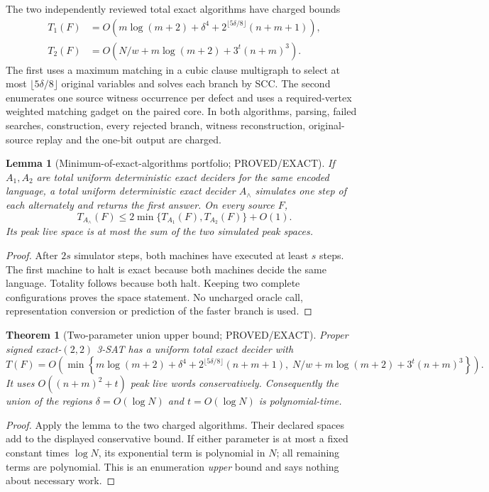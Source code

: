 \documentclass[11pt]{article}
\newtheorem{theorem}{Theorem}
\newtheorem{lemma}{Lemma}
\begin{document}
The two independently reviewed total exact algorithms have charged bounds
\begin{align*}
T_1(F)&=O\!\left(m\log(m+2)+\delta^4+
  2^{\lfloor5\delta/8\rfloor}(n+m+1)\right),\\
T_2(F)&=O\!\left(N/w+m\log(m+2)+
  3^t(n+m)^3\right).
\end{align*}
The first uses a maximum matching in a cubic clause multigraph to select at
most $\lfloor5\delta/8\rfloor$ original variables and solves each branch by
SCC.  The second enumerates one source witness occurrence per defect and
uses a required-vertex weighted matching gadget on the paired core.  In both
algorithms, parsing, failed searches, construction, every rejected branch,
witness reconstruction, original-source replay and the one-bit output are
charged.

\begin{lemma}[Minimum-of-exact-algorithms portfolio; PROVED/EXACT]
If $A_1,A_2$ are total uniform deterministic exact deciders for the same
encoded language, a total uniform deterministic exact decider $A_\wedge$
simulates one step of each alternately and returns the first answer.  On
every source $F$,
\[
T_{A_\wedge}(F)\le 2\min\{T_{A_1}(F),T_{A_2}(F)\}+O(1).
\]
Its peak live space is at most the sum of the two simulated peak spaces.
\end{lemma}
\begin{proof}
After $2s$ simulator steps, both machines have executed at least $s$ steps.
The first machine to halt is exact because both machines decide the same
language.  Totality follows because both halt.  Keeping two complete
configurations proves the space statement.  No uncharged oracle call,
representation conversion or prediction of the faster branch is used.
\end{proof}

\begin{theorem}[Two-parameter union upper bound; PROVED/EXACT]
Proper signed exact-$(2,2)$ 3-SAT has a uniform total exact decider with
\[
T(F)=O\!\left(\min\left\{
m\log(m+2)+\delta^4+2^{\lfloor5\delta/8\rfloor}(n+m+1),
\;N/w+m\log(m+2)+3^t(n+m)^3
\right\}\right).
\]
It uses $O((n+m)^2+t)$ peak live words conservatively.  Consequently the
union of the regions $\delta=O(\log N)$ and $t=O(\log N)$ is polynomial-time.
\end{theorem}
\begin{proof}
Apply the lemma to the two charged algorithms.  Their declared spaces add
to the displayed conservative bound.  If either parameter is at most a
fixed constant times $\log N$, its exponential term is polynomial in $N$;
all remaining terms are polynomial.  This is an enumeration \emph{upper}
bound and says nothing about necessary work.
\end{proof}
\end{document}
